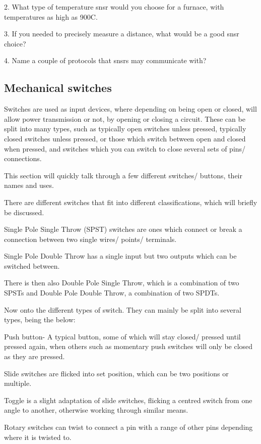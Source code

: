 \documentclass[a4paper,11pt]{report}
\begin{document}
2. What type of temperature \gls{snsr} would you choose for a furnace, with temperatures as high as 900\degree C.

3. If you needed to precisely measure a distance, what would be a good \gls{snsr} choice?

4. Name a couple of protocols that \gls{snsr}s may communicate with?

\subsection{Mechanical switches}

Switches are used as input devices, where depending on being open or closed, will allow power transmission or not, by opening or closing a circuit. These can be split into many types, such as typically open switches unless pressed, typically closed switches unless pressed, or those which switch between open and closed when pressed, and switches which you can switch to close several sets of pins/ connections.

This section will quickly talk through a few different switches/ buttons, their names and uses.

There are different switches that fit into different classifications, which will briefly be discussed.

Single Pole Single Throw (SPST) switches are ones which connect or break a connection between two single wires/ points/ terminals.

Single Pole Double Throw has a single input but two outputs which can be switched between.

There is then also Double Pole Single Throw, which is a combination of two SPSTs and Double Pole Double Throw, a combination of two SPDTs.

Now onto the different types of switch. They can mainly be split into several types, being the below:

Push button- A typical button, some of which will stay closed/ pressed until pressed again, when others such as momentary push switches will only be closed as they are pressed.

Slide switches are flicked into set position, which can be two positions or multiple.

Toggle is a slight adaptation of slide switches, flicking a centred switch from one angle to another, otherwise working through similar means.

Rotary switches can twist to connect a pin with a range of other pins depending where it is twisted to.
\end{document}

